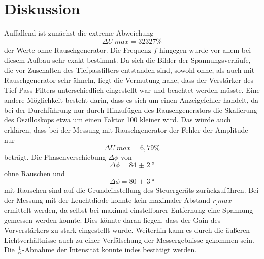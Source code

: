 \section{Diskussion}
\label{sec:Diskussion}
Auffallend ist zunächst die extreme Abweichung
\[
\Delta U_.{max}=32327\%
\]
der Werte ohne Rauschgenerator.
Die Frequenz $f$ hingegen wurde vor allem bei diesem Aufbau sehr exakt bestimmt.
Da sich die Bilder der Spannungsverläufe, die vor Zuschalten des Tiefpassfilters entstanden sind, sowohl ohne, als auch mit Rauschgenerator sehr ähneln, liegt die Vermutung nahe, dass der Verstärker des Tief-Pass-Filters unterschiedlich eingestellt war und beachtet werden müsste.
Eine andere Möglichkeit besteht darin, dass es sich um einen Anzeigefehler handelt, da bei der Durchführung nur durch Hinzufügen des Rauschgenerators die Skalierung des Oszilloskops etwa um einen Faktor 100 kleiner wird.
Das würde auch erklären, dass bei der Messung mit Rauschgenerator der Fehler der Amplitude nur
\[
\Delta U_.{max}= 6,79\%
\]
beträgt.
Die Phasenverschiebung $\Delta\phi$ von
\[
\Delta\phi = \SI{84(2)}{\degree}
\]
ohne Rauschen und
\[
\Delta\phi = \SI{80(3)}{\degree}
\]
mit Rauschen sind auf die Grundeinstellung des Steuergeräts zurückzuführen.
Bei der Messung mit der Leuchtdiode konnte kein maximaler Abstand $r_.{max}$ ermittelt werden, da selbst bei maximal einstellbarer Entfernung eine Spannung gemessen werden konnte.
Dies könnte daran liegen, dass der Gain des Vorverstärkers zu stark eingestellt wurde.
Weiterhin kann es durch die äußeren Lichtverhältnisse auch zu einer Verfälschung der Messergebnisse gekommen sein. Die $\frac{1}{r^2}$-Abnahme der Intensität konnte indes bestätigt werden.